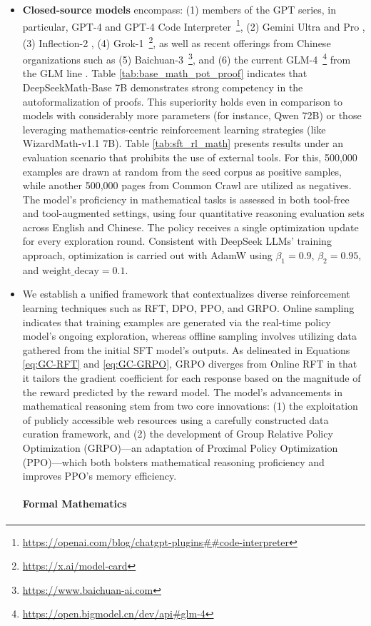 \begin{itemize}[topsep=0pt]
\begin{itemize}[topsep=0pt]
    \item \textbf{Closed-source models} encompass: (1) members of the GPT series, in particular, GPT-4 \citep{gpt4} and GPT-4 Code Interpreter~\footnote{\url{https://openai.com/blog/chatgpt-plugins\#\#code-interpreter}}, (2) Gemini Ultra and Pro \citep{gemini}, (3) Inflection-2 \citep{inflection-2}, (4) Grok-1~\footnote{\url{https://x.ai/model-card}}, as well as recent offerings from Chinese organizations such as (5) Baichuan-3~\footnote{\url{https://www.baichuan-ai.com}}, and (6) the current GLM-4~\footnote{\url{https://open.bigmodel.cn/dev/api\#glm-4}} from the GLM line \citep{glm}. Table \ref{tab:base_math_pot_proof} indicates that DeepSeekMath-Base 7B demonstrates strong competency in the autoformalization of proofs. This superiority holds even in comparison to models with considerably more parameters (for instance, Qwen 72B) or those leveraging mathematics-centric reinforcement learning strategies (like WizardMath-v1.1 7B). Table \ref{tab:sft_rl_math} presents results under an evaluation scenario that prohibits the use of external tools. For this, 500,000 examples are drawn at random from the seed corpus as positive samples, while another 500,000 pages from Common Crawl are utilized as negatives. The model's proficiency in mathematical tasks is assessed in both tool-free and tool-augmented settings, using four quantitative reasoning evaluation sets across English and Chinese. The policy receives a single optimization update for every exploration round. Consistent with DeepSeek LLMs' training approach, optimization is carried out with AdamW \citep{adamW} using $\beta_1=0.9$, $\beta_2=0.95$, and $\mathrm{weight\_decay}=0.1$. \item We establish a unified framework that contextualizes diverse reinforcement learning techniques such as RFT, DPO, PPO, and GRPO. Online sampling indicates that training examples are generated via the real-time policy model’s ongoing exploration, whereas offline sampling involves utilizing data gathered from the initial SFT model’s outputs. As delineated in Equations \ref{eq:GC-RFT} and \ref{eq:GC-GRPO}, GRPO diverges from Online RFT in that it tailors the gradient coefficient for each response based on the magnitude of the reward predicted by the reward model. The model’s advancements in mathematical reasoning stem from two core innovations: (1) the exploitation of publicly accessible web resources using a carefully constructed data curation framework, and (2) the development of Group Relative Policy Optimization (GRPO)—an adaptation of Proximal Policy Optimization (PPO)—which both bolsters mathematical reasoning proficiency and improves PPO’s memory efficiency. \paragraph{Formal Mathematics}


\end{itemize}
\end{itemize}
